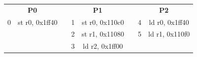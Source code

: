 \documentclass[12pt]{article}
\begin{document}
\begin{table}[H]
 	\centering
	\begin{tabular}{|cc|c|cc|c|cc|}
		\cline{1-2} \cline{4-5} \cline{7-8}
		\multicolumn{2}{|c|}{\textbf{P0}}                               & \textbf{} & \multicolumn{2}{c|}{\textbf{P1}}                               & \textbf{} & \multicolumn{2}{c|}{\textbf{P2}}                               \\ \cline{1-2} \cline{4-5} \cline{7-8} 
		\multicolumn{1}{|c|}{0} & {\color[HTML]{329A9D} st r0, 0x1ff40} &           & \multicolumn{1}{c|}{1} & {\color[HTML]{D729BE} st r0, 0x110c0} &           & \multicolumn{1}{c|}{4} & {\color[HTML]{329A9D} ld r0, 0x1ff40} \\ \cline{1-2} \cline{4-5} \cline{7-8} 
		\multicolumn{1}{|c|}{}  &                                       &           & \multicolumn{1}{c|}{2} & {\color[HTML]{FF7A00} st r1, 0x11080} &           & \multicolumn{1}{c|}{5} & {\color[HTML]{D729BE} ld r1, 0x110f0} \\ \cline{1-2} \cline{4-5} \cline{7-8} 
		\multicolumn{1}{|c|}{}  &                                       &           & \multicolumn{1}{c|}{3} & {\color[HTML]{6200C9} ld r2, 0x1ff00} &           & \multicolumn{1}{c|}{}  &                                       \\ \cline{1-2} \cline{4-5} \cline{7-8} 
	\end{tabular}
\end{table}
\end{document}
